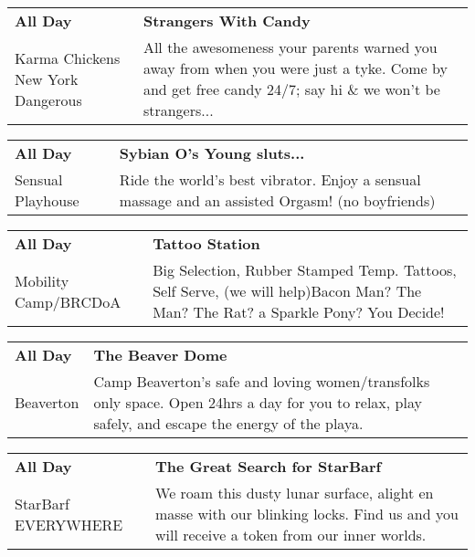 \begin{tabular}{ p{1in} p{2.2in} }
    \textbf{All Day} & \textbf{Strangers With Candy} \\
    Karma Chickens \newline New York Dangerous & All the awesomeness your parents warned you away from when you were just a tyke. Come by and get free candy 24/7; say hi \& we won't be strangers... \\
    \hline 
\end{tabular}
    
\begin{tabular}{ p{1in} p{2.2in} }
    \textbf{All Day} & \textbf{Sybian O's Young sluts...} \\
    Sensual Playhouse \newline  & Ride the world's best vibrator. Enjoy a sensual massage and an assisted Orgasm! (no boyfriends) \\
    \hline 
\end{tabular}
    
\begin{tabular}{ p{1in} p{2.2in} }
    \textbf{All Day} & \textbf{Tattoo Station} \\
    Mobility Camp/BRCDoA \newline  & Big Selection, Rubber Stamped Temp. Tattoos, Self Serve, (we will help)Bacon Man? The Man? The Rat? a Sparkle Pony? You Decide! \\
    \hline 
\end{tabular}
    
\begin{tabular}{ p{1in} p{2.2in} }
    \textbf{All Day} & \textbf{The Beaver Dome} \\
    Beaverton \newline  & Camp Beaverton's safe and loving women/transfolks only space. Open 24hrs a day for you to relax, play safely, and escape the energy of the playa. \\
    \hline 
\end{tabular}
    
\begin{tabular}{ p{1in} p{2.2in} }
    \textbf{All Day} & \textbf{The Great Search for StarBarf} \\
    StarBarf \newline EVERYWHERE & We roam this dusty lunar surface, alight en masse with our blinking locks. Find us and you will receive a token from our inner worlds. \\
    \hline 
\end{tabular}
    
